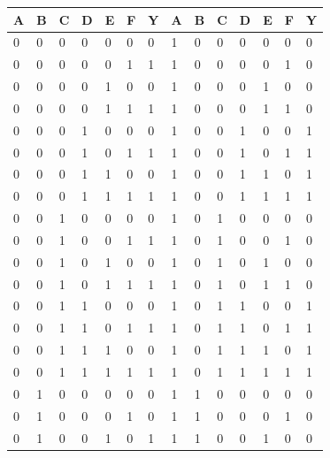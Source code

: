 \documentclass{report}
\begin{document}
                \begin{longtable}{|l|l|l|l|l|l|l|l|l|l|l|l|l|l|}
                    \hline
                    A & B & C & D & E & F & Y & A & B & C & D & E & F & Y \\ \hline
                    0 & 0 & 0 & 0 & 0 & 0 & 0 & 1 & 0 & 0 & 0 & 0 & 0 & 0 \\ \hline
                    0 & 0 & 0 & 0 & 0 & 1 & 1 & 1 & 0 & 0 & 0 & 0 & 1 & 0 \\ \hline
                    0 & 0 & 0 & 0 & 1 & 0 & 0 & 1 & 0 & 0 & 0 & 1 & 0 & 0 \\ \hline
                    0 & 0 & 0 & 0 & 1 & 1 & 1 & 1 & 0 & 0 & 0 & 1 & 1 & 0 \\ \hline
                    0 & 0 & 0 & 1 & 0 & 0 & 0 & 1 & 0 & 0 & 1 & 0 & 0 & 1 \\ \hline
                    0 & 0 & 0 & 1 & 0 & 1 & 1 & 1 & 0 & 0 & 1 & 0 & 1 & 1 \\ \hline
                    0 & 0 & 0 & 1 & 1 & 0 & 0 & 1 & 0 & 0 & 1 & 1 & 0 & 1 \\ \hline
                    0 & 0 & 0 & 1 & 1 & 1 & 1 & 1 & 0 & 0 & 1 & 1 & 1 & 1 \\ \hline
                    0 & 0 & 1 & 0 & 0 & 0 & 0 & 1 & 0 & 1 & 0 & 0 & 0 & 0 \\ \hline
                    0 & 0 & 1 & 0 & 0 & 1 & 1 & 1 & 0 & 1 & 0 & 0 & 1 & 0 \\ \hline
                    0 & 0 & 1 & 0 & 1 & 0 & 0 & 1 & 0 & 1 & 0 & 1 & 0 & 0 \\ \hline
                    0 & 0 & 1 & 0 & 1 & 1 & 1 & 1 & 0 & 1 & 0 & 1 & 1 & 0 \\ \hline
                    0 & 0 & 1 & 1 & 0 & 0 & 0 & 1 & 0 & 1 & 1 & 0 & 0 & 1 \\ \hline
                    0 & 0 & 1 & 1 & 0 & 1 & 1 & 1 & 0 & 1 & 1 & 0 & 1 & 1 \\ \hline
                    0 & 0 & 1 & 1 & 1 & 0 & 0 & 1 & 0 & 1 & 1 & 1 & 0 & 1 \\ \hline
                    0 & 0 & 1 & 1 & 1 & 1 & 1 & 1 & 0 & 1 & 1 & 1 & 1 & 1 \\ \hline
                    0 & 1 & 0 & 0 & 0 & 0 & 0 & 1 & 1 & 0 & 0 & 0 & 0 & 0 \\ \hline
                    0 & 1 & 0 & 0 & 0 & 1 & 0 & 1 & 1 & 0 & 0 & 0 & 1 & 0 \\ \hline
                    0 & 1 & 0 & 0 & 1 & 0 & 1 & 1 & 1 & 0 & 0 & 1 & 0 & 0 \\ \hline

\end{longtable}
\end{document}
